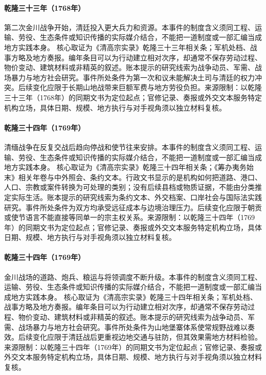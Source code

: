 \hypertarget{civic:EQ-1768-SECOND-JINCHUAN-WAR}{}\paragraph{乾隆三十三年（1768年）}第二次金川战争开始，清廷投入更大兵力和资源。本事件的制度含义须同工程、运输、劳役、生态条件或知识传播的实际媒介结合，不能把一道制度或一部汇编当成地方实践本身。 核心取证为《清高宗实录》乾隆三十三年相关条；军机处档、战事方略及地方奏报。编年条目可以为行动建立相对次序，却通常不保存劳动过程、物价变动、建筑材料或非精英的叙述。账本提示的研究线索为战争动员、军需、战场暴力与地方社会研究。事件所处条件为第一次和议未能解决土司与清廷的权力冲突。后续变化应限于长期山地战带来巨额军费与地方劳役负担。来源限制：以乾隆三十三年（1768年）的同期文书为定位起点；官修记录、奏报或外交文本服务特定机构立场，具体日期、规模、地方执行与对手视角须以独立材料复核。
\hypertarget{civic:EQ-1769-BURMA-SETTLEMENT}{}\paragraph{乾隆三十四年（1769年）}清缅战争在反复交战后趋向停战和使节往来安排。本事件的制度含义须同工程、运输、劳役、生态条件或知识传播的实际媒介结合，不能把一道制度或一部汇编当成地方实践本身。 核心取证为《清高宗实录》乾隆三十四年相关条；《筹办夷务始末》相关年卷与中外照会、条约文本。行政文书显示的是机构如何把道路、港口、人口、宗教或案件转换为可处理的类别；没有后续县档或物质证据，不能由分类推定实际生活。账本提示的研究线索为条约文本、外交档案、口岸社会与国际法实践研究。事件所处条件为双方均承受远征成本与边境治理压力。后续变化应限于朝贡或使节语言不能直接等同单一的宗主权关系。来源限制：以乾隆三十四年（1769年）的同期文书为定位起点；官修记录、奏报或外交文本服务特定机构立场，具体日期、规模、地方执行与对手视角须以独立材料复核。
\hypertarget{civic:EQ-1769-JINCHUAN-ESCALATION}{}\paragraph{乾隆三十四年（1769年）}金川战场的道路、炮兵、粮运与将领调度不断升级。本事件的制度含义须同工程、运输、劳役、生态条件或知识传播的实际媒介结合，不能把一道制度或一部汇编当成地方实践本身。 核心取证为《清高宗实录》乾隆三十四年相关条；军机处档、战事方略及地方奏报。编年条目可以为行动建立相对次序，却通常不保存劳动过程、物价变动、建筑材料或非精英的叙述。账本提示的研究线索为战争动员、军需、战场暴力与地方社会研究。事件所处条件为山地堡寨体系使常规野战难以奏效。后续变化应限于清廷战后更重视边地交通与驻防，但其效果需地方材料检验。来源限制：以乾隆三十四年（1769年）的同期文书为定位起点；官修记录、奏报或外交文本服务特定机构立场，具体日期、规模、地方执行与对手视角须以独立材料复核。
